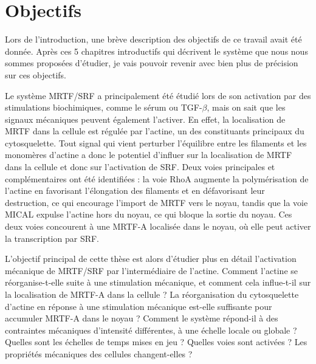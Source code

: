 \documentclass{report}
\begin{document}
\chapter*{Objectifs}

Lors de l'introduction, une brève description des objectifs de ce travail avait été donnée. Après ces 5 chapitres introductifs qui décrivent le système que nous nous sommes proposées d'étudier, je vais pouvoir revenir avec bien plus de précision sur ces objectifs. 

Le système MRTF/SRF a principalement été étudié lors de son activation par des stimulations biochimiques, comme le sérum ou TGF-$\beta$, mais on sait que les signaux mécaniques peuvent également l'activer. 
En effet, la localisation de MRTF dans la cellule est régulée par l'actine, un des constituants principaux du cytosquelette. 
Tout signal qui vient perturber l'équilibre entre les filaments et les monomères d'actine a donc le potentiel d'influer sur la localisation de MRTF dans la cellule et donc sur l'activation de SRF. 
Deux voies principales et complémentaires ont été identifiées : la voie RhoA augmente la polymérisation de l'actine en favorisant l'élongation des filaments et en défavorisant leur destruction, ce qui encourage l'import de MRTF vers le noyau, tandis que la voie MICAL expulse l'actine hors du noyau, ce qui bloque la sortie du noyau. Ces deux voies concourent à une MRTF-A localisée dans le noyau, où elle peut activer la transcription par SRF. 

L'objectif principal de cette thèse est alors d'étudier plus en détail l'activation mécanique de MRTF/SRF par l'intermédiaire de l'actine. Comment l'actine se réorganise-t-elle suite à une stimulation mécanique, et comment cela influe-t-il sur la localisation de MRTF-A dans la cellule ? La réorganisation du cytosquelette d'actine en réponse à une stimulation mécanique est-elle suffisante pour accumuler MRTF-A dans le noyau ? Comment le système répond-il à des contraintes mécaniques d'intensité différentes, à une échelle locale ou globale ? Quelles sont les échelles de temps mises en jeu ? Quelles voies sont activées ? Les propriétés mécaniques des cellules changent-elles ? 
\end{document}
